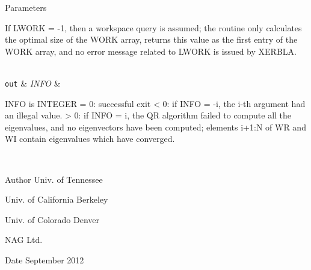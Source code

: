 \begin{DoxyParams}[1]{Parameters}
\begin{DoxyVerb}
          If LWORK = -1, then a workspace query is assumed; the routine
          only calculates the optimal size of the WORK array, returns
          this value as the first entry of the WORK array, and no error
          message related to LWORK is issued by XERBLA.\end{DoxyVerb}
\\
\hline
\mbox{\tt out}  & {\em I\+N\+F\+O} & \begin{DoxyVerb}          INFO is INTEGER
          = 0:  successful exit
          < 0:  if INFO = -i, the i-th argument had an illegal value.
          > 0:  if INFO = i, the QR algorithm failed to compute all the
                eigenvalues, and no eigenvectors have been computed;
                elements i+1:N of WR and WI contain eigenvalues which
                have converged.\end{DoxyVerb}
 \\
\hline
\end{DoxyParams}
\begin{DoxyAuthor}{Author}
Univ. of Tennessee 

Univ. of California Berkeley 

Univ. of Colorado Denver 

N\+A\+G Ltd. 
\end{DoxyAuthor}
\begin{DoxyDate}{Date}
September 2012 
\end{DoxyDate}
\hypertarget{group__realGEeigen_gadf06d28b4793cbab21e898fcb713d5a5}{}
